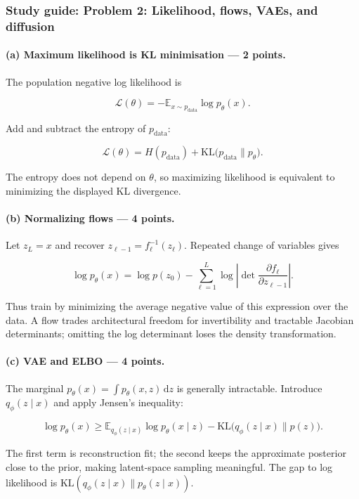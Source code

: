 \documentclass[11pt,a4paper]{article}
\begin{document}
\subsubsection{Study guide: Problem 2: Likelihood, flows, VAEs, and diffusion}

\paragraph{(a) Maximum likelihood is KL minimisation --- 2 points.}

The population negative log likelihood is

\[
\mathcal{L}(\theta)
=-\mathbb{E}_{x\sim p_{\mathrm{data}}}\log p_\theta(x).
\]

Add and subtract the entropy of $p_{\mathrm{data}}$:

\[
\mathcal{L}(\theta)
=H(p_{\mathrm{data}})
+\mathrm{KL}\bigl(p_{\mathrm{data}}\|p_\theta\bigr).
\]

The entropy does not depend on $\theta$, so maximizing likelihood is equivalent to minimizing the displayed KL divergence.

\paragraph{(b) Normalizing flows --- 4 points.}

Let $z_L=x$ and recover $z_{\ell-1}=f_\ell^{-1}(z_\ell)$. Repeated change of variables gives

\[
\log p_\theta(x)
=\log p(z_0)
-\sum_{\ell=1}^L
\log\left|\det\frac{\partial f_\ell}{\partial z_{\ell-1}}\right|.
\]

Thus train by minimizing the average negative value of this expression over the data. A flow trades architectural freedom for invertibility and tractable Jacobian determinants; omitting the log determinant loses the density transformation.

\paragraph{(c) VAE and ELBO --- 4 points.}

The marginal $p_\theta(x)=\int p_\theta(x,z)\,\mathrm{d}z$ is generally intractable. Introduce $q_\phi(z\mid x)$ and apply Jensen's inequality:

\[
\log p_\theta(x)
\geq
\mathbb{E}_{q_\phi(z\mid x)}\log p_\theta(x\mid z)
-\mathrm{KL}\bigl(q_\phi(z\mid x)\|p(z)\bigr).
\]

The first term is reconstruction fit; the second keeps the approximate posterior close to the prior, making latent-space sampling meaningful. The gap to log likelihood is $\mathrm{KL}(q_\phi(z\mid x)\|p_\theta(z\mid x))$.
\end{document}

